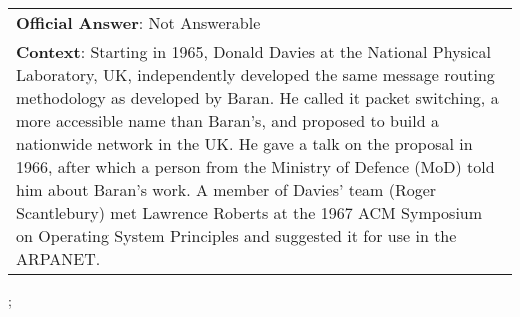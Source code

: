 \begin{figure*}[ht]
{\begin{tabular}{p{}}
            \textbf{Official Answer}: Not Answerable                                                                                                                                                                                                                                                                                                                                                                                                                                                                                                                                                                  \\
            \textbf{Context}: Starting in 1965, Donald Davies at the National Physical Laboratory, UK, independently developed the same message routing methodology as developed by Baran. He called it packet switching, a more accessible name than Baran's, and proposed to build a nationwide network in the UK. He gave a talk on the proposal in 1966, after which a person from the Ministry of Defence (MoD) told him about Baran's work. A member of Davies' team (Roger Scantlebury) met Lawrence Roberts at the 1967 ACM Symposium on Operating System Principles and suggested it for use in the ARPANET. \\
        \end{tabular}
    };
    \label{fig:ex-5a667f50846392001a1e1c67}
\end{figure*}

